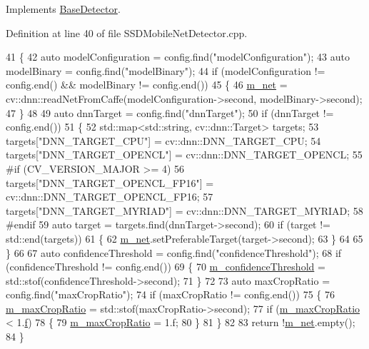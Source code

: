 Implements \mbox{\hyperlink{class_base_detector_a44c53608e9e4e3455ff553d987165260}{Base\+Detector}}.



Definition at line 40 of file S\+S\+D\+Mobile\+Net\+Detector.\+cpp.


\begin{DoxyCode}
41 \{
42     \textcolor{keyword}{auto} modelConfiguration = config.find(\textcolor{stringliteral}{"modelConfiguration"});
43     \textcolor{keyword}{auto} modelBinary = config.find(\textcolor{stringliteral}{"modelBinary"});
44     \textcolor{keywordflow}{if} (modelConfiguration != config.end() && modelBinary != config.end())
45     \{
46         \mbox{\hyperlink{class_s_s_d_mobile_net_detector_a49cee71e617fd5999e73fbaba9859a71}{m\_net}} = cv::dnn::readNetFromCaffe(modelConfiguration->second, modelBinary->second);
47     \}
48 
49     \textcolor{keyword}{auto} dnnTarget = config.find(\textcolor{stringliteral}{"dnnTarget"});
50     \textcolor{keywordflow}{if} (dnnTarget != config.end())
51     \{
52         std::map<std::string, cv::dnn::Target> targets;
53         targets[\textcolor{stringliteral}{"DNN\_TARGET\_CPU"}] = cv::dnn::DNN\_TARGET\_CPU;
54         targets[\textcolor{stringliteral}{"DNN\_TARGET\_OPENCL"}] = cv::dnn::DNN\_TARGET\_OPENCL;
55 \textcolor{preprocessor}{#if (CV\_VERSION\_MAJOR >= 4)}
56         targets[\textcolor{stringliteral}{"DNN\_TARGET\_OPENCL\_FP16"}] = cv::dnn::DNN\_TARGET\_OPENCL\_FP16;
57         targets[\textcolor{stringliteral}{"DNN\_TARGET\_MYRIAD"}] = cv::dnn::DNN\_TARGET\_MYRIAD;
58 \textcolor{preprocessor}{#endif}
59         \textcolor{keyword}{auto} target = targets.find(dnnTarget->second);
60         \textcolor{keywordflow}{if} (target != std::end(targets))
61         \{
62             \mbox{\hyperlink{class_s_s_d_mobile_net_detector_a49cee71e617fd5999e73fbaba9859a71}{m\_net}}.setPreferableTarget(target->second);
63         \}
64 
65     \}
66 
67     \textcolor{keyword}{auto} confidenceThreshold = config.find(\textcolor{stringliteral}{"confidenceThreshold"});
68     \textcolor{keywordflow}{if} (confidenceThreshold != config.end())
69     \{
70         \mbox{\hyperlink{class_s_s_d_mobile_net_detector_ae854ddcece46a348d20debc470882b3b}{m\_confidenceThreshold}} = std::stof(confidenceThreshold->second);
71     \}
72 
73     \textcolor{keyword}{auto} maxCropRatio = config.find(\textcolor{stringliteral}{"maxCropRatio"});
74     \textcolor{keywordflow}{if} (maxCropRatio != config.end())
75     \{
76         \mbox{\hyperlink{class_s_s_d_mobile_net_detector_a5fb35dca36d36fb75c65d1846fe65233}{m\_maxCropRatio}} = std::stof(maxCropRatio->second);
77         \textcolor{keywordflow}{if} (\mbox{\hyperlink{class_s_s_d_mobile_net_detector_a5fb35dca36d36fb75c65d1846fe65233}{m\_maxCropRatio}} < 1.\mbox{\hyperlink{rings_8cpp_a77369fc4d5326a16d2c603e032023528}{f}})
78         \{
79             \mbox{\hyperlink{class_s_s_d_mobile_net_detector_a5fb35dca36d36fb75c65d1846fe65233}{m\_maxCropRatio}} = 1.f;
80         \}
81     \}
82 
83     \textcolor{keywordflow}{return} !\mbox{\hyperlink{class_s_s_d_mobile_net_detector_a49cee71e617fd5999e73fbaba9859a71}{m\_net}}.empty();
84 \}
\end{DoxyCode}
